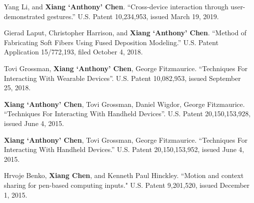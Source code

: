  {
    Yang Li, and \textbf{Xiang `Anthony’ Chen}. ``Cross-device interaction through user-demonstrated gestures.'' U.S. Patent 10,234,953, issued March 19, 2019.
}

 {
	Gierad Laput, Christopher Harrison, and \textbf{Xiang `Anthony’ Chen}. ``Method of Fabricating Soft Fibers Using Fused Deposition Modeling.'' U.S. Patent Application 15/772,193, filed October 4, 2018.
}

 {
	Tovi Grossman, \textbf{Xiang `Anthony’ Chen}, George Fitzmaurice. ``Techniques For Interacting With Wearable Devices''. U.S. Patent 10,082,953, issued September 25, 2018.
}

 {
	\textbf{Xiang `Anthony’ Chen}, Tovi Grossman, Daniel Wigdor, George Fitzmaurice. ``Techniques For Interacting With Handheld Devices''. U.S. Patent 20,150,153,928, issued June 4, 2015.
}

 {
	\textbf{Xiang `Anthony’ Chen}, Tovi Grossman, George Fitzmaurice. ``Techniques For Interacting With Handheld Devices.'' U.S. Patent 20,150,153,952, issued June 4, 2015.
}

 {
	Hrvoje Benko, \textbf{Xiang Chen}, and Kenneth Paul Hinckley. ``Motion and context sharing for pen-based computing inputs." U.S. Patent 9,201,520, issued December 1, 2015.
}